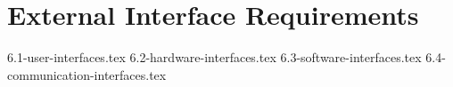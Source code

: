 \section{External Interface Requirements}

{6.1-user-interfaces.tex}
{6.2-hardware-interfaces.tex}
{6.3-software-interfaces.tex}
{6.4-communication-interfaces.tex}
